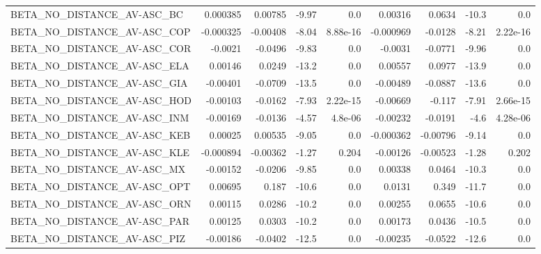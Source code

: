\begin{tabular}{lrrrrrrrr}
BETA\_NO\_DISTANCE\_AV-ASC\_BC             &    0.000385 &      0.00785 &   -9.97 &      0.0 &    0.00316 &      0.0634 &        -10.3 &           0.0 \\
BETA\_NO\_DISTANCE\_AV-ASC\_COP            &   -0.000325 &     -0.00408 &   -8.04 & 8.88e-16 &  -0.000969 &     -0.0128 &        -8.21 &      2.22e-16 \\
BETA\_NO\_DISTANCE\_AV-ASC\_COR            &     -0.0021 &      -0.0496 &   -9.83 &      0.0 &    -0.0031 &     -0.0771 &        -9.96 &           0.0 \\
BETA\_NO\_DISTANCE\_AV-ASC\_ELA            &     0.00146 &       0.0249 &   -13.2 &      0.0 &    0.00557 &      0.0977 &        -13.9 &           0.0 \\
BETA\_NO\_DISTANCE\_AV-ASC\_GIA            &    -0.00401 &      -0.0709 &   -13.5 &      0.0 &   -0.00489 &     -0.0887 &        -13.6 &           0.0 \\
BETA\_NO\_DISTANCE\_AV-ASC\_HOD            &    -0.00103 &      -0.0162 &   -7.93 & 2.22e-15 &   -0.00669 &      -0.117 &        -7.91 &      2.66e-15 \\
BETA\_NO\_DISTANCE\_AV-ASC\_INM            &    -0.00169 &      -0.0136 &   -4.57 &  4.8e-06 &   -0.00232 &     -0.0191 &         -4.6 &      4.28e-06 \\
BETA\_NO\_DISTANCE\_AV-ASC\_KEB            &     0.00025 &      0.00535 &   -9.05 &      0.0 &  -0.000362 &    -0.00796 &        -9.14 &           0.0 \\
BETA\_NO\_DISTANCE\_AV-ASC\_KLE            &   -0.000894 &     -0.00362 &   -1.27 &    0.204 &   -0.00126 &    -0.00523 &        -1.28 &         0.202 \\
BETA\_NO\_DISTANCE\_AV-ASC\_MX             &    -0.00152 &      -0.0206 &   -9.85 &      0.0 &    0.00338 &      0.0464 &        -10.3 &           0.0 \\
BETA\_NO\_DISTANCE\_AV-ASC\_OPT            &     0.00695 &        0.187 &   -10.6 &      0.0 &     0.0131 &       0.349 &        -11.7 &           0.0 \\
BETA\_NO\_DISTANCE\_AV-ASC\_ORN            &     0.00115 &       0.0286 &   -10.2 &      0.0 &    0.00255 &      0.0655 &        -10.6 &           0.0 \\
BETA\_NO\_DISTANCE\_AV-ASC\_PAR            &     0.00125 &       0.0303 &   -10.2 &      0.0 &    0.00173 &      0.0436 &        -10.5 &           0.0 \\
BETA\_NO\_DISTANCE\_AV-ASC\_PIZ            &    -0.00186 &      -0.0402 &   -12.5 &      0.0 &   -0.00235 &     -0.0522 &        -12.6 &           0.0 \\

\end{tabular}
